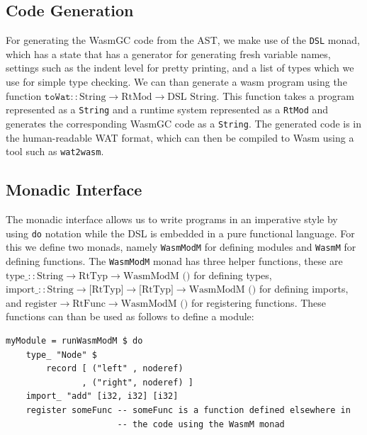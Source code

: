 \subsection{Code Generation}
For generating the WasmGC code from the AST, we make use of the \texttt{DSL} monad, which has a state that has a generator for generating fresh variable names, settings such as the indent level for pretty printing, and a list of types which we use for simple type checking. We can than generate a wasm program using the function \texttt{$\texttt{toWat} :: \text{String} \rightarrow \text{RtMod} \rightarrow \text{DSL String}$}. This function takes a program represented as a \texttt{String} and a runtime system represented as a \texttt{RtMod} and generates the corresponding WasmGC code as a \texttt{String}. The generated code is in the human-readable WAT format, which can then be compiled to Wasm using a tool such as \texttt{wat2wasm}.

\subsection{Monadic Interface}
The monadic interface allows us to write programs in an imperative style by using \texttt{do} notation while the DSL is embedded in a pure functional language. For this we define two monads, namely \texttt{WasmModM} for defining modules and \texttt{WasmM} for defining functions. The \texttt{WasmModM} monad has three helper functions, these are 
\texttt{$\text{type\_} :: \text{String} \rightarrow \text{RtTyp} \rightarrow \text{WasmModM ()}$} for defining types, \texttt{$\text{import\_} :: \text{String} \rightarrow \text{[RtTyp]} \rightarrow \text{[RtTyp]} \rightarrow \text{WasmModM ()}$} for defining imports, and \texttt{$\text{register} \rightarrow \text{RtFunc} \rightarrow \text{WasmModM ()}$} for registering functions. These functions can than be used as follows to define a module:
\begin{verbatim}
myModule = runWasmModM $ do
    type_ "Node" $
        record [ ("left" , noderef)
               , ("right", noderef) ]
    import_ "add" [i32, i32] [i32] 
    register someFunc -- someFunc is a function defined elsewhere in 
                      -- the code using the WasmM monad
\end{verbatim}

